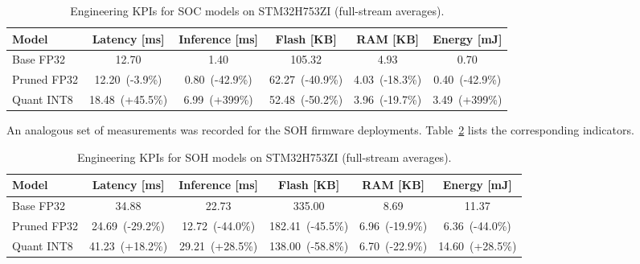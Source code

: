\documentclass[review]{elsarticle}
\begin{document}
\begin{table}[t!]
      \centering
      \caption{Engineering KPIs for SOC models on STM32H753ZI (full-stream averages).}
      \label{tab:kpi}
        \begin{tabular}{lccccc}
            \toprule
            Model & Latency [ms] & Inference [ms] & Flash [KB] & RAM [KB] & Energy [mJ] \\
            \midrule
            Base FP32 & 12.70 & 1.40 & 105.32 & 4.93 & 0.70 \\
            Pruned FP32 & 12.20~\textcolor{mgGreen}{(-3.9\%)} & 0.80~\textcolor{mgGreen}{(-42.9\%)} & 62.27~\textcolor{mgGreen}{(-40.9\%)} & 4.03~\textcolor{mgGreen}{(-18.3\%)} & 0.40~\textcolor{mgGreen}{(-42.9\%)} \\
            Quant INT8 & 18.48~\textcolor{mgRed}{(+45.5\%)} & 6.99~\textcolor{mgRed}{(+399\%)} & 52.48~\textcolor{mgGreen}{(-50.2\%)} & 3.96~\textcolor{mgGreen}{(-19.7\%)} & 3.49~\textcolor{mgRed}{(+399\%)} \\
            \bottomrule
        \end{tabular}
  \end{table}
An analogous set of measurements was recorded for the SOH firmware deployments. Table~\ref{tab:kpi_soh} lists the corresponding indicators.
  \begin{table}[t!]
      \centering
      \caption{Engineering KPIs for SOH models on STM32H753ZI (full-stream averages).}
      \label{tab:kpi_soh}
        \begin{tabular}{lccccc}
            \toprule
            Model & Latency [ms] & Inference [ms] & Flash [KB] & RAM [KB] & Energy [mJ] \\
            \midrule
            Base FP32 & 34.88 & 22.73 & 335.00 & 8.69 & 11.37 \\
            Pruned FP32 & 24.69~\textcolor{mgGreen}{(-29.2\%)} & 12.72~\textcolor{mgGreen}{(-44.0\%)} & 182.41~\textcolor{mgGreen}{(-45.5\%)} & 6.96~\textcolor{mgGreen}{(-19.9\%)} & 6.36~\textcolor{mgGreen}{(-44.0\%)} \\
            Quant INT8 & 41.23~\textcolor{mgRed}{(+18.2\%)} & 29.21~\textcolor{mgRed}{(+28.5\%)} & 138.00~\textcolor{mgGreen}{(-58.8\%)} & 6.70~\textcolor{mgGreen}{(-22.9\%)} & 14.60~\textcolor{mgRed}{(+28.5\%)} \\
            \bottomrule
        \end{tabular}
\end{table}
\end{document}
